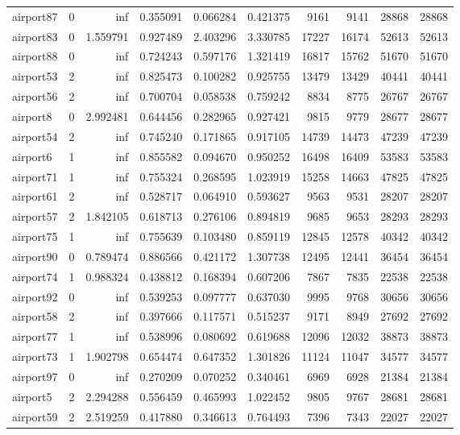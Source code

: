 \begin{longtable}{|l|r|r|r|r|r|r|r|r|r|}
airport87 & 0 & inf & 0.355091 & 0.066284 & 0.421375 & 9161 & 9141 & 28868 & 28868 \\
airport83 & 0 & 1.559791 & 0.927489 & 2.403296 & 3.330785 & 17227 & 16174 & 52613 & 52613 \\
airport88 & 0 & inf & 0.724243 & 0.597176 & 1.321419 & 16817 & 15762 & 51670 & 51670 \\
airport53 & 2 & inf & 0.825473 & 0.100282 & 0.925755 & 13479 & 13429 & 40441 & 40441 \\
airport56 & 2 & inf & 0.700704 & 0.058538 & 0.759242 & 8834 & 8775 & 26767 & 26767 \\
airport8 & 0 & 2.992481 & 0.644456 & 0.282965 & 0.927421 & 9815 & 9779 & 28677 & 28677 \\
airport54 & 2 & inf & 0.745240 & 0.171865 & 0.917105 & 14739 & 14473 & 47239 & 47239 \\
airport6 & 1 & inf & 0.855582 & 0.094670 & 0.950252 & 16498 & 16409 & 53583 & 53583 \\
airport71 & 1 & inf & 0.755324 & 0.268595 & 1.023919 & 15258 & 14663 & 47825 & 47825 \\
airport61 & 2 & inf & 0.528717 & 0.064910 & 0.593627 & 9563 & 9531 & 28207 & 28207 \\
airport57 & 2 & 1.842105 & 0.618713 & 0.276106 & 0.894819 & 9685 & 9653 & 28293 & 28293 \\
airport75 & 1 & inf & 0.755639 & 0.103480 & 0.859119 & 12845 & 12578 & 40342 & 40342 \\
airport90 & 0 & 0.789474 & 0.886566 & 0.421172 & 1.307738 & 12495 & 12441 & 36454 & 36454 \\
airport74 & 1 & 0.988324 & 0.438812 & 0.168394 & 0.607206 & 7867 & 7835 & 22538 & 22538 \\
airport92 & 0 & inf & 0.539253 & 0.097777 & 0.637030 & 9995 & 9768 & 30656 & 30656 \\
airport58 & 2 & inf & 0.397666 & 0.117571 & 0.515237 & 9171 & 8949 & 27692 & 27692 \\
airport77 & 1 & inf & 0.538996 & 0.080692 & 0.619688 & 12096 & 12032 & 38873 & 38873 \\
airport73 & 1 & 1.902798 & 0.654474 & 0.647352 & 1.301826 & 11124 & 11047 & 34577 & 34577 \\
airport97 & 0 & inf & 0.270209 & 0.070252 & 0.340461 & 6969 & 6928 & 21384 & 21384 \\
airport5 & 2 & 2.294288 & 0.556459 & 0.465993 & 1.022452 & 9805 & 9767 & 28681 & 28681 \\
airport59 & 2 & 2.519259 & 0.417880 & 0.346613 & 0.764493 & 7396 & 7343 & 22027 & 22027 \\

\end{longtable}
